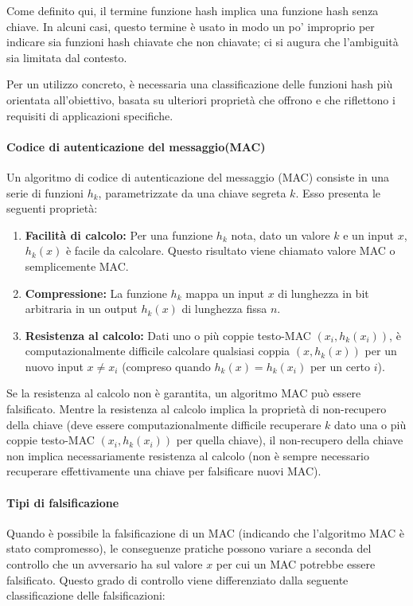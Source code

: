 \documentclass{article}
\theoremstyle{definition}
\begin{document}
Come definito qui, il termine funzione hash implica una funzione hash senza chiave. In alcuni casi, questo termine è usato in modo un po' improprio per indicare sia funzioni hash chiavate che non chiavate; ci si augura che l'ambiguità sia limitata dal contesto.

Per un utilizzo concreto, è necessaria una classificazione delle funzioni hash più orientata all'obiettivo, basata su ulteriori proprietà che offrono e che riflettono i requisiti di applicazioni specifiche. 

\paragraph{Codice di autenticazione del messaggio(MAC)}
Un algoritmo di codice di autenticazione del messaggio (MAC) consiste in una serie di funzioni \(h_k\), parametrizzate da una chiave segreta \(k\). Esso presenta le seguenti proprietà:
\begin{enumerate}
    \item \textbf{Facilità di calcolo:} Per una funzione \(h_k\) nota, dato un valore \(k\) e un input \(x\), \(h_k(x)\) è facile da calcolare. Questo risultato viene chiamato valore MAC o semplicemente MAC.
    \item \textbf{Compressione:} La funzione \(h_k\) mappa un input \(x\) di lunghezza in bit arbitraria in un output \(h_k(x)\) di lunghezza fissa \(n\).
    \item \textbf{Resistenza al calcolo:} Dati uno o più coppie testo-MAC \((x_i, h_k(x_i))\), è computazionalmente difficile calcolare qualsiasi coppia \((x, h_k(x))\) per un nuovo input \(x \neq x_i\) (compreso quando \(h_k(x) = h_k(x_i)\) per un certo \(i\)).
\end{enumerate}
Se la resistenza al calcolo non è garantita, un algoritmo MAC può essere falsificato. Mentre la resistenza al calcolo implica la proprietà di non-recupero della chiave (deve essere computazionalmente difficile recuperare \(k\) dato una o più coppie testo-MAC \((x_i, h_k(x_i))\) per quella chiave), il non-recupero della chiave non implica necessariamente resistenza al calcolo (non è sempre necessario recuperare effettivamente una chiave per falsificare nuovi MAC).

\paragraph{Tipi di falsificazione}
Quando è possibile la falsificazione di un MAC (indicando che l'algoritmo MAC è stato compromesso), le conseguenze pratiche possono variare a seconda del controllo che un avversario ha sul valore \(x\) per cui un MAC potrebbe essere falsificato. Questo grado di controllo viene differenziato dalla seguente classificazione delle falsificazioni:
\end{document}

